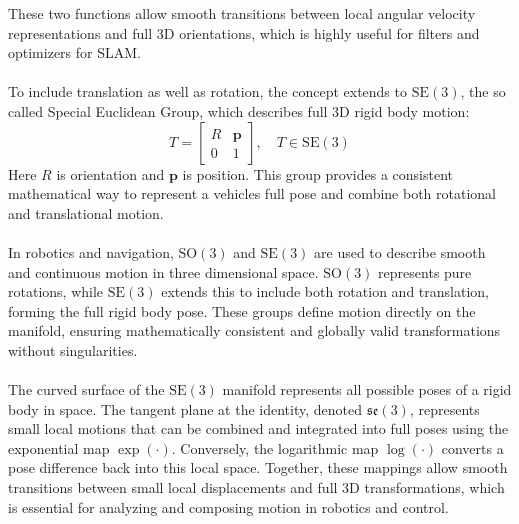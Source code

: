 These two functions allow smooth transitions between local angular velocity representations and full 3D orientations, which is highly useful for filters and optimizers for SLAM.  
\\ \\
To include translation as well as rotation, the concept extends to $\mathrm{SE}(3)$, the so called Special Euclidean Group, which describes full 3D rigid body motion:
\begin{equation}
    T =
    \begin{bmatrix}
        R & \mathbf{p} \\
        0 & 1
    \end{bmatrix},
    \quad T \in \mathrm{SE}(3)
    \label{eq:SE3-definition}
\end{equation}
\noindent
Here $R$ is orientation and $\mathbf{p}$ is position. This group provides a consistent mathematical way to represent a vehicles full pose and combine both rotational and translational motion.  
\\ \\
In robotics and navigation, $\mathrm{SO}(3)$ and $\mathrm{SE}(3)$ are used to describe smooth and continuous motion in three dimensional space. $\mathrm{SO}(3)$ represents pure rotations, while $\mathrm{SE}(3)$ extends this to include both rotation and translation, forming the full rigid body pose. These groups define motion directly on the manifold, ensuring mathematically consistent and globally valid transformations without singularities.  
\\ \\
The curved surface of the $\mathrm{SE}(3)$ manifold represents all possible poses of a rigid body in space. The tangent plane at the identity, denoted $\mathfrak{se}(3)$, represents small local motions that can be combined and integrated into full poses using the exponential map $\exp(\cdot)$. Conversely, the logarithmic map $\log(\cdot)$ converts a pose difference back into this local space. Together, these mappings allow smooth transitions between small local displacements and full 3D transformations, which is essential for analyzing and composing motion in robotics and control.  
\\ \\
